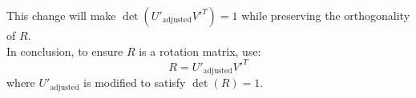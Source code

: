 \documentclass{article}
\begin{document}
\begin{enumerate}
\begin{enumerate}
  This change will make \( \det(U'_{\text{adjusted}} V'^T) = 1 \) while preserving the orthogonality of \( R \).
\\
In conclusion, to ensure \( R \) is a rotation matrix, use:
\[
R = U'_{\text{adjusted}} V'^T
\]
where \( U'_{\text{adjusted}} \) is modified to satisfy \( \det(R) = 1 \).
\end{enumerate}


\end{enumerate}
\end{document}
